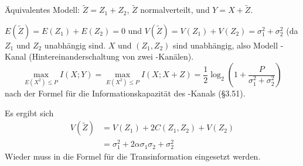 \documentclass{article}
\begin{document}
\begin{solution}
    Äquivalentes Modell: $\tilde Z = Z_1+Z_2$, $\tilde Z$ normalverteilt, und $Y=X+\tilde Z$.
    \begin{tasks}
            \item $E(\tilde Z)=E(Z_1)+E(Z_2)=0$ und $V(\tilde Z)=V(Z_1)+V(Z_2)=\sigma_1^2+\sigma_2^2$ (da $Z_1$ und $Z_2$ unabhängig sind.
        $X$ und $(Z_1,Z_2)$ sind unabhängig, also Modell -Kanal (Hintereinanderschaltung von zwei -Kanälen).
        $$
        \max_{E(X^2)\leq P}{I(X;Y)} = \max_{E(X^2)\leq P}{I(X;X+Z)} = \frac 1 2\log_2\left(1+\frac{P}{\sigma_1^2+\sigma_2^2}\right)
            $$ nach der Formel für die Informationskapazität des -Kanals (§3.51).
                \item Es ergibt sich
            \begin{align*}
                V(\tilde Z) &= V(Z_1)+2C(Z_1,Z_2)+V(Z_2)\\
                &=\sigma_1^2+2\alpha\sigma_1\sigma_2+\sigma_2^2
            \end{align*}
            Wieder muss in die Formel für die Transinformation eingesetzt werden.
        \end{tasks}
\end{solution}
\end{document}
